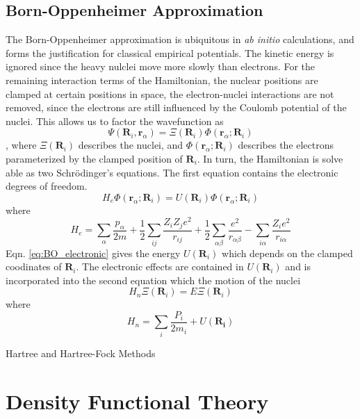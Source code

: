 \subsection{Born-Oppenheimer Approximation}
The Born-Oppenheimer approximation \cite{born1927_bo} is ubiquitous in \emph{ab initio} calculations, and forms the justification for classical empirical potentials.  The kinetic energy is ignored since the heavy nulclei move more slowly than electrons.  For the remaining interaction terms of the Hamiltonian, the nuclear positions are clamped at certain positions in space, the electron-nuclei interactions are not removed, since the electrons are still influenced by the Coulomb potential of the nuclei.  This allows us to factor the wavefunction as
\begin{equation}
	\Psi(\bm{R}_i,\bm{r}_\alpha) = \Xi(\bm{R}_i)\Phi(\bm{r}_\alpha;\bm{R}_i)
\end{equation},
where $\Xi(\bm{R}_i)$ describes the nuclei, and $\Phi(\bm{r}_\alpha;\bm{R}_i)$ describes the electrons parameterized by the clamped position of $\bm{R}_i$.  In turn, the Hamiltonian is solve able as two Schr\"{o}dinger's equations.  The first equation contains the electronic degrees of freedom.
\begin{equation}
\label{eq:BO_electronic}
     H_{e}\Phi(\bm{r}_\alpha;\bm{R}_i)=U(\bm{R}_i)\Phi(\bm{r}_\alpha;\bm{R}_i)
\end{equation}
where
\begin{equation}
	H_e = \sum_\alpha \frac{p_\alpha}{2m}
	      + \frac{1}{2} \sum_{ij} \frac{Z_i Z_j e^2}{r_{ij}}
	      + \frac{1}{2} \sum_{\alpha\beta} \frac{e^2}{r_{\alpha\beta}}
	      - \sum_{i\alpha} \frac{Z_i e^2}{r_{i\alpha}}
\end{equation}
Eqn. \ref{eq:BO_electronic} gives the energy $U(\bm{R}_i)$ which depends on the clamped coodinates of $\bm{R}_i$.  The electronic effects are contained in $U(\bm{R}_i)$ and is incorporated into the second equation which the motion of the nuclei
\begin{equation}
\label{eq:BO_nuclei}
    H_n\Xi(\bm{R}_i)=E\Xi(\bm{R}_i)
\end{equation}
where
\begin{equation}
\label{eq:H_n}
    H_n = \sum_i \frac{P_i}{2m_i} + U(\bm{R_i})
\end{equation}

Hartree and Hartree-Fock Methods
\section{Density Functional Theory}

